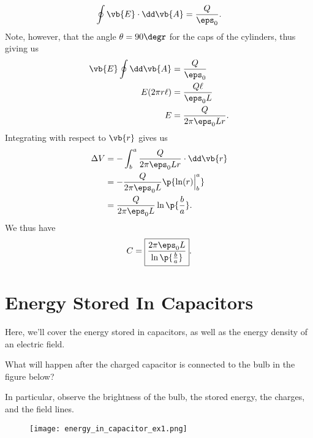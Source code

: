 \documentclass[11pt]{article}
\begin{document}
\[\oint \vb{E}\cdot\dd\vb{A} = \frac{Q}{\eps_0}.\]
Note, however, that the angle $\theta = 90\degr$ for the caps of the cylinders, thus giving us
\begin{align*}
    \vb{E}\oint \dd\vb{A} &= \frac{Q}{\eps_0} \\
    E(2\pi r\ell) &= \frac{Q\ell}{\eps_0 L} \\
    E &= \frac{Q}{2\pi\eps_0 Lr}.
\end{align*}
Integrating with respect to $\vb{r}$ gives us
\begin{align*}
    \Delta V &= -\int_b^a \frac{Q}{2\pi\eps_0 Lr} \cdot\dd\vb{r} \\
    &= -\frac{Q}{2\pi\eps_0 L} \p{\ln(r)\Big|_b^a} \\
    &= \frac{Q}{2\pi\eps_0 L} \ln\p{\frac{b}{a}}.    
\end{align*}
We thus have
\[C = \boxed{\frac{2\pi\eps_0 L}{\ln\p{\frac{b}{a}}}}.\]
\section{Energy Stored In Capacitors}
Here, we'll cover the energy stored in capacitors, as well as the energy density of an electric field.
\begin{question}
    What will happen after the charged capacitor is connected to the bulb in the figure below?
\end{question}
In particular, observe the brightness of the bulb, the stored energy, the charges, and the field lines.

\begin{figure}[H]
    \centering
    \texttt{[image: energy\_in\_capacitor\_ex1.png]}
\end{figure}
\end{document}
